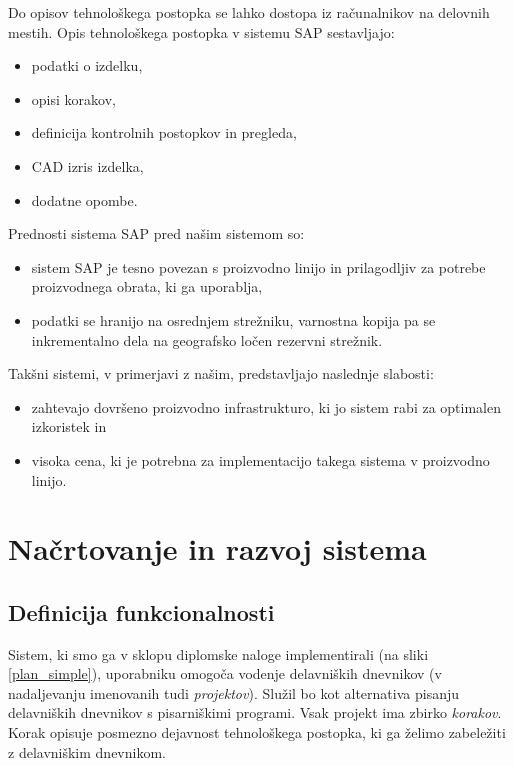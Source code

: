 \documentclass[a4paper, 12pt]{book}
\begin{document}
Do opisov tehnološkega postopka se lahko dostopa iz računalnikov na delovnih mestih.
Opis tehnološkega postopka v sistemu SAP sestavljajo:
\begin{itemize}
	\item podatki o izdelku,
	\item opisi korakov,
	\item definicija kontrolnih postopkov in pregleda, 
	\item CAD izris izdelka,
	\item dodatne opombe.
\end{itemize}

\noindent Prednosti sistema SAP pred našim sistemom so:
\begin{itemize}
	\item sistem SAP je tesno povezan s proizvodno linijo in prilagodljiv za potrebe proizvodnega obrata, ki ga uporablja,
	\item podatki se hranijo na osrednjem strežniku, varnostna kopija pa se inkrementalno dela na geografsko ločen rezervni strežnik.
\end{itemize}

Takšni sistemi, v primerjavi z našim, predstavljajo naslednje slabosti:
\begin{itemize}
	\item zahtevajo dovršeno proizvodno infrastrukturo, ki jo sistem rabi za optimalen izkoristek in
	\item visoka cena, ki je potrebna za implementacijo takega sistema v proizvodno linijo.
\end{itemize}




\chapter{Načrtovanje in razvoj sistema}



\section{Definicija funkcionalnosti} \label{architecture}

Sistem, ki smo ga v sklopu diplomske naloge implementirali (na sliki \ref{plan_simple}), uporabniku omogoča vodenje delavniških dnevnikov (v nadaljevanju imenovanih tudi \textit{projektov}).
Služil bo kot alternativa pisanju delavniških dnevnikov s pisarniškimi programi.
Vsak projekt ima zbirko \textit{korakov}.
Korak opisuje posmezno dejavnost tehnološkega postopka, ki ga želimo zabeležiti z delavniškim dnevnikom.
\end{document}
